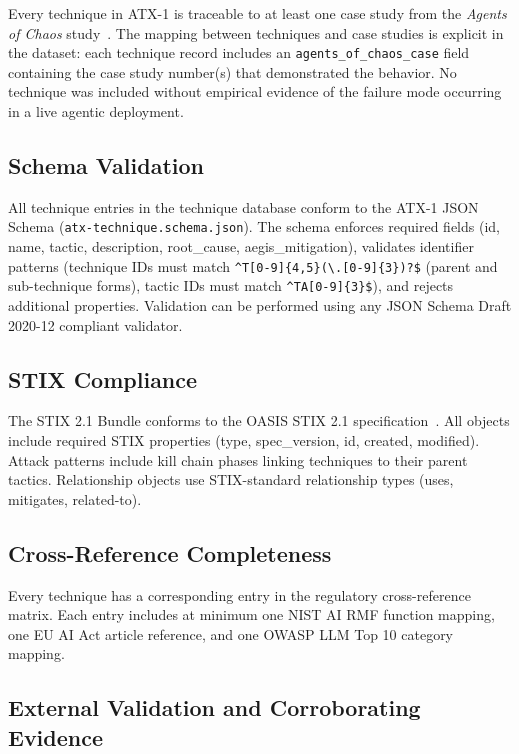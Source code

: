\documentclass{IEEEoj-data}
\newcommand{\replaced}[2]{#1}
\newcommand{\added}[1]{#1}
\newcommand{\deleted}[1]{}
\begin{document}
Every technique in ATX-1 is traceable to at least one case study from the {\it Agents of Chaos} study~\cite{ref4}. The mapping between techniques and case studies is explicit in the dataset: each technique record includes an \texttt{agents\_of\_chaos\_case} field containing the case study number(s) that demonstrated the behavior. No technique was included without empirical evidence of the failure mode occurring in a live agentic deployment.

\subsection*{Schema Validation}

All technique entries in the technique database conform to the ATX-1 JSON Schema (\texttt{atx-technique.schema.json}). The schema enforces required fields (id, name, tactic, description, \deleted{severity, }root\_cause, aegis\_mitigation), validates identifier patterns (technique IDs must match \replaced{\texttt{\^{}T[0-9]\{4,5\}(\textbackslash.[0-9]\{3\})?\$} (parent and sub-technique forms)}{\texttt{\^{}T[0-9]\{4\}\$}}, tactic IDs must match \texttt{\^{}TA[0-9]\{3\}\$}), \deleted{constrains severity values to the enumeration (critical, high, medium, low), }and rejects additional properties. Validation can be performed using any JSON Schema Draft 2020-12 compliant validator.

\subsection*{STIX Compliance}

The STIX 2.1 Bundle conforms to the OASIS STIX 2.1 specification~\cite{ref7}. All objects include required STIX properties (type, spec\_version, id, created, modified). Attack patterns include kill chain phases linking techniques to their parent tactics. Relationship objects use STIX-standard relationship types (uses, mitigates, related-to).

\subsection*{Cross-Reference Completeness}

Every technique has a corresponding entry in the regulatory cross-reference matrix. Each entry includes at minimum one NIST AI RMF function mapping, one EU AI Act article reference, and one OWASP LLM Top 10 category mapping.

\subsection*{\added{External Validation and Corroborating Evidence}}
\end{document}
